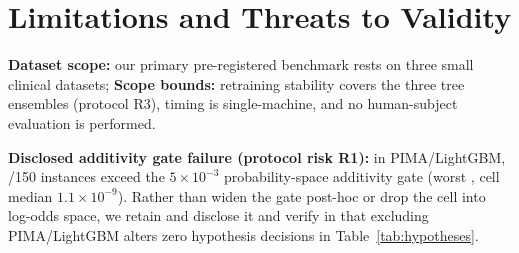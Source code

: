 \section{Limitations and Threats to Validity}\label{sec:limitations}

\textbf{Dataset scope:} our primary pre-registered benchmark rests on three small clinical
datasets;  \textbf{Scope bounds:}
retraining stability covers the three tree ensembles (protocol R3), timing is
single-machine, and no human-subject evaluation is performed.

\textbf{Disclosed additivity gate failure (protocol risk R1):} in PIMA/LightGBM,
\AdditivityWorstOutliers{}/150 instances exceed the $5\times 10^{-3}$ probability-space
additivity gate (worst \AdditivityWorstMax{}, cell median $1.1\times 10^{-9}$). Rather than
widen the gate post-hoc or drop the cell into log-odds space, we retain and disclose it and
verify in  that excluding PIMA/LightGBM alters zero
hypothesis decisions in Table~\ref{tab:hypotheses}.
